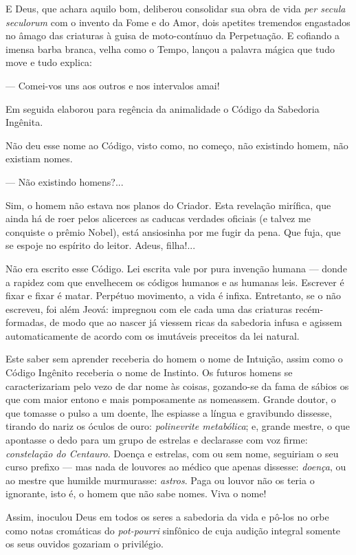 E Deus, que achara aquilo bom, deliberou consolidar sua obra de vida
\emph{per secula seculorum} com o invento da Fome e do Amor, dois
apetites tremendos engastados no âmago das criaturas à guisa de
moto-contínuo da Perpetuação. E cofiando a imensa barba branca, velha
como o Tempo, lançou a palavra mágica que tudo move e tudo explica:

--- Comei-vos uns aos outros e nos intervalos amai!

Em seguida elaborou para regência da animalidade o Código da Sabedoria
Ingênita.

Não deu esse nome ao Código, visto como, no começo, não existindo homem,
não existiam nomes.

--- Não existindo homens?...

Sim, o homem não estava nos planos do Criador. Esta revelação mirífica,
que ainda há de roer pelos alicerces as caducas verdades oficiais (e
talvez me conquiste o prêmio Nobel), está ansiosinha por me fugir da
pena. Que fuja, que se espoje no espírito do leitor. Adeus, filha!...

Não era escrito esse Código. Lei escrita vale por pura invenção humana
--- donde a rapidez com que envelhecem os códigos humanos e as humanas
leis. Escrever é fixar e fixar é matar. Perpétuo movimento, a vida é
infixa. Entretanto, se o não escreveu, foi além Jeová: impregnou com ele
cada uma das criaturas recém-formadas, de modo que ao nascer já viessem
ricas da sabedoria infusa e agissem automaticamente de acordo com os
imutáveis preceitos da lei natural.

Este saber sem aprender receberia do homem o nome de Intuição, assim
como o Código Ingênito receberia o nome de Instinto. Os futuros homens
se caracterizariam pelo vezo de dar nome às coisas, gozando-se da fama
de sábios os que com maior entono e mais pomposamente as nomeassem.
Grande doutor, o que tomasse o pulso a um doente, lhe espiasse a língua
e gravibundo dissesse, tirando do nariz os óculos de ouro:
\emph{polinevrite metabólica}; e, grande mestre, o que apontasse o dedo
para um grupo de estrelas e declarasse com voz firme: \emph{constelação
do Centauro}. Doença e estrelas, com ou sem nome, seguiriam o seu curso
prefixo --- mas nada de louvores ao médico que apenas dissesse:
\emph{doença}, ou ao mestre que humilde murmurasse: \emph{astros}. Paga
ou louvor não os teria o ignorante, isto é, o homem que não sabe nomes.
Viva o nome!

Assim, inoculou Deus em todos os seres a sabedoria da vida e pô-los no
orbe como notas cromáticas do \emph{pot-pourri} sinfônico de cuja
audição integral somente os seus ouvidos gozariam o privilégio.

